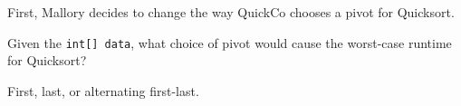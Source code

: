 \question First, Mallory decides to change the way QuickCo chooses a pivot for Quicksort.

Given the \texttt{int[] data}, what choice of pivot would cause the worst-case runtime for Quicksort?

\begin{solution}[0.5in]
First, last, or alternating first-last.
\end{solution}
